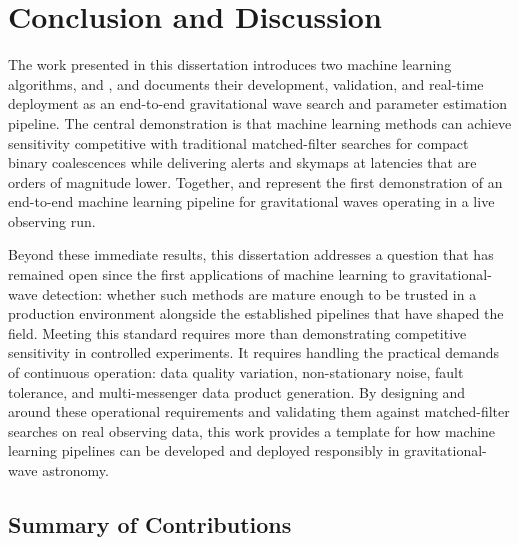 \chapter{Conclusion and Discussion}
\label{conclusion_chapter}

The work presented in this dissertation introduces two machine learning algorithms, \aframe and \amplfi, and documents their development, validation, and real-time deployment as an end-to-end gravitational wave search and parameter estimation pipeline.
The central demonstration is that machine learning methods can achieve sensitivity competitive with traditional matched-filter searches for compact binary coalescences while delivering alerts and skymaps at latencies that are orders of magnitude lower.
Together, \aframe and \amplfi represent the first demonstration of an end-to-end machine learning pipeline for gravitational waves operating in a live observing run.

Beyond these immediate results, this dissertation addresses a question that has remained open since the first applications of machine learning to gravitational-wave detection: whether such methods are mature enough to be trusted in a production environment alongside the established pipelines that have shaped the field.
Meeting this standard requires more than demonstrating competitive sensitivity in controlled experiments.
It requires handling the practical demands of continuous operation: data quality variation, non-stationary noise, fault tolerance, and multi-messenger data product generation.
By designing \aframe and \amplfi around these operational requirements and validating them against matched-filter searches on real observing data, this work provides a template for how machine learning pipelines can be developed and deployed responsibly in gravitational-wave astronomy.

\section{Summary of Contributions}

